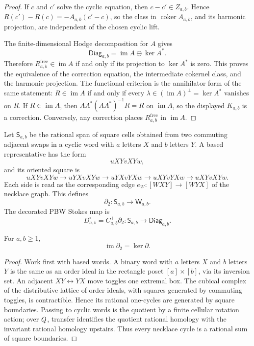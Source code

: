 \begin{proof}
  If \(c\) and \(c'\) solve the cyclic equation, then
  \(c-c'\in Z_{a,b}\).  Hence
  \(R(c')-R(c)=-A_{a,b}(c'-c)\), so the class in
  \(\operatorname{coker}A_{a,b}\), and its harmonic projection, are
  independent of the chosen cyclic lift.

  The finite-dimensional Hodge decomposition for \(A\) gives
  \[
    \mathsf{Diag}_{a,b}=\operatorname{im}A\oplus\ker A^* .
  \]
  Therefore \(R^{\mathrm{free}}_{a,b}\in\operatorname{im}A\) if and
  only if its projection to \(\ker A^*\) is zero.  This proves the
  equivalence of the correction equation, the intermediate cokernel
  class, and the harmonic projection.  The functional criterion is the
  annihilator form of the same statement:
  \(R\in\operatorname{im}A\) if and only if every
  \(\lambda\in(\operatorname{im}A)^\perp=\ker A^*\) vanishes on \(R\).
  If \(R\in\operatorname{im}A\), then
  \(AA^*(AA^*)^{-1}R=R\) on \(\operatorname{im}A\), so the displayed
  \(K_{a,b}\) is a correction.  Conversely, any correction places
  \(R^{\mathrm{free}}_{a,b}\) in \(\operatorname{im}A\).
\end{proof}

\begin{defn}
\label{def:app-square-cell-pbw-stokes-complex}
  Let \(\mathsf S_{a,b}\) be the rational span of square cells obtained
  from two commuting adjacent swaps in a cyclic word with \(a\) letters
  \(X\) and \(b\) letters \(Y\).  A based representative has the form
  \[
    uXYvXYw,
  \]
  and its oriented square is
  \[
    uXYvXYw\to uYXvXYw\to uYXvYXw\to
    uXYvYXw\to uXYvXYw .
  \]
  Each side is read as the corresponding edge
  \(e_W:[WXY]\to[WYX]\) of the necklace graph.  This defines
  \[
    \partial_2\colon \mathsf S_{a,b}\longrightarrow\mathsf W_{a,b}.
  \]
  The decorated PBW Stokes map is
  \[
    D^\square_{a,b}
      =
      C^+_{a,b}\partial_2\colon
      \mathsf S_{a,b}\longrightarrow\mathsf{Diag}_{a,b}.
  \]
\end{defn}

\begin{lem}
\label{lem:app-ordinary-necklace-stokes}
  For \(a,b\geq1\),
  \[
    \operatorname{im}\partial_2=\ker\partial .
  \]
\end{lem}

\begin{proof}
  Work first with based words.  A binary word with \(a\) letters \(X\)
  and \(b\) letters \(Y\) is the same as an order ideal in the rectangle
  poset \([a]\times[b]\), via its inversion set.  An adjacent
  \(XY\leftrightarrow YX\) move toggles one extremal box.  The cubical
  complex of the distributive lattice of order ideals, with squares
  generated by commuting toggles, is contractible.  Hence its rational
  one-cycles are generated by square boundaries.  Passing to cyclic words
  is the quotient by a finite cellular rotation action; over \(Q\),
  transfer identifies the quotient rational homology with the invariant
  rational homology upstairs.  Thus every necklace cycle is a rational
  sum of square boundaries.
\end{proof}


